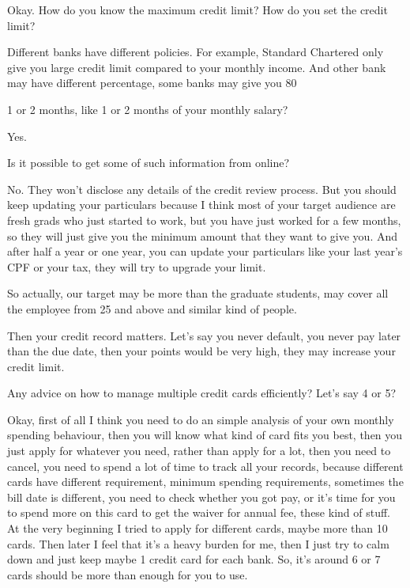 \begin{description}[leftmargin=4em,style=nextline]
	\item[JH:] Okay. How do you know the maximum credit limit? How do you set the credit limit?

	\item[HJ:] Different banks have different policies. For example, Standard Chartered only give you large credit limit compared to your monthly income. And other bank may have different percentage, some banks may give you 80%

	\item[JH:] 1 or 2 months, like 1 or 2 months of your monthly salary?

	\item[HJ:] Yes.

	\item[JH:] Is it possible to get some of such information from online?

	\item[HJ:] No. They won't disclose any details of the credit review process. But you should keep updating your particulars because I think most of your target audience are fresh grads who just started to work, but you have just worked for a few months, so they will just give you the minimum amount that they want to give you. And after half a year or one year, you can update your particulars like your last year's CPF or your tax, they will try to upgrade your limit.

	\item[JH:] So actually, our target may be more than the graduate students, may cover all the employee from 25 and above and similar kind of people.

	\item[HJ:] Then your credit record matters. Let's say you never default, you never pay later than the due date, then your points would be very high, they may increase your credit limit.

	\item[LD:] Any advice on how to manage multiple credit cards efficiently? Let's say 4 or 5?

	Okay, first of all I think you need to do an simple analysis of your own monthly spending behaviour, then you will know what kind of card fits you best, then you just apply for whatever you need, rather than apply for a lot, then you need to cancel, you need to spend a lot of time to track all your records, because different cards have different requirement, minimum spending requirements, sometimes the bill date is different, you need to check whether you got pay, or it's time for you to spend more on this card to get the waiver for annual fee, these kind of stuff. At the very beginning I tried to apply for different cards, maybe more than 10 cards. Then later I feel that it's a heavy burden for me, then I just try to calm down and just keep maybe 1 credit card for each bank. So, it's around 6 or 7 cards should be more than enough for you to use.


\end{description}
